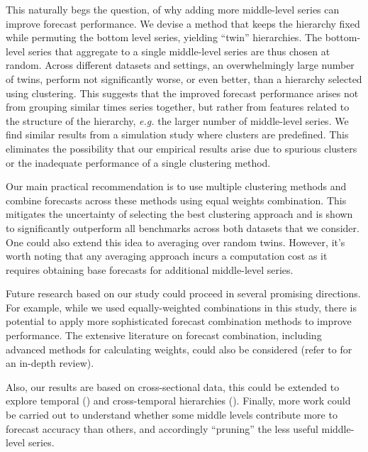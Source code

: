 \documentclass[a4paper,review,12pt,authoryear]{elsarticle}
\begin{document}
This naturally begs the question, of why adding more middle-level series can improve forecast performance. We devise a method that keeps the hierarchy fixed while permuting the bottom level series, yielding ``twin'' hierarchies. The bottom-level series that aggregate to a single middle-level series are thus chosen at random. Across different datasets and settings, an overwhelmingly large number of twins, perform not significantly worse, or even better, than a hierarchy selected using clustering. This suggests that the improved forecast performance arises not from grouping similar times series together, but rather from features related to the structure of the hierarchy, \textit{e.g.} the larger number of middle-level series. We find similar results from a simulation study where clusters are predefined. 
This eliminates the possibility that our empirical results arise due to  spurious clusters or the inadequate performance of a single clustering method.
 
Our main practical recommendation is to use multiple clustering methods and combine forecasts across these methods using equal weights combination. 
This mitigates the uncertainty of selecting the best clustering approach and is shown to significantly outperform all benchmarks across both datasets that we consider. %
One could also extend this idea to averaging over random twins. However, it's worth noting that any averaging approach incurs a computation cost as it requires obtaining base forecasts for additional middle-level series.



Future research based on our study could proceed in several promising directions. 
For example, while we used equally-weighted combinations in this study, there is  potential to apply more sophisticated forecast combination methods to improve performance. The extensive literature on forecast combination, including advanced methods for calculating weights, could also be considered (refer to \citealp{wangForecastCombinations50year2022} for an in-depth review).

Also, our results are based on cross-sectional data, this could be extended to explore temporal (\citealp{athanasopoulosForecastingTemporalHierarchies2017}) and cross-temporal hierarchies (\citealp{girolimettoCrosstemporalProbabilisticForecast2023a}). Finally, more work could be carried out to understand whether some middle levels contribute more to forecast accuracy than others, and accordingly ``pruning'' the less useful middle-level series.\\
\end{document}
